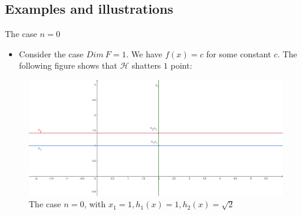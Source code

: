 \documentclass[9pt]{beamer}
\begin{document}
\subsection{Examples and illustrations}
\begin{frame}{The case $n=0$}
\begin{itemize}
    \item Consider the case $Dim \ F = 1$. We have $f(x) = c$ for some constant $c$. The following figure shows that $\mathcal{H}$ shatters $1$ point:
\end{itemize}

\pause
\begin{figure}
        \includegraphics[width = 1 \linewidth]{geogebra-export (1).png}
        \caption{The case $n=0$, with $x_1=1, h_1(x)=1,h_2(x)=\sqrt{2}$}
        \label{fig:my_label}
\end{figure}
\end{frame}
\end{document}
